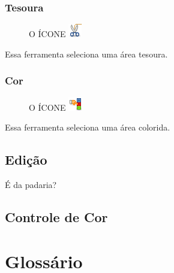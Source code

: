 \documentclass[12pt,onecolumn]{article}
\begin{document}
      \subsubsection{Tesoura}
      \begin{figure}[H]
        O ÍCONE
        \includegraphics{gimp-icons/stock-tool-iscissors-22.png}
        \label{fig:scissorsselect}
      \end{figure}
      Essa ferramenta seleciona uma área tesoura.
      
      \subsubsection{Cor}
      \begin{figure}[H]
        O ÍCONE
        \includegraphics{gimp-icons/stock-tool-by-color-select-22.png}
        \label{fig:colorselect}
      \end{figure}
      Essa ferramenta seleciona uma área colorida.


  \subsection{Edição}
    É da padaria?
    
  \subsection{Controle de Cor}

\section{Glossário}
\end{document}
